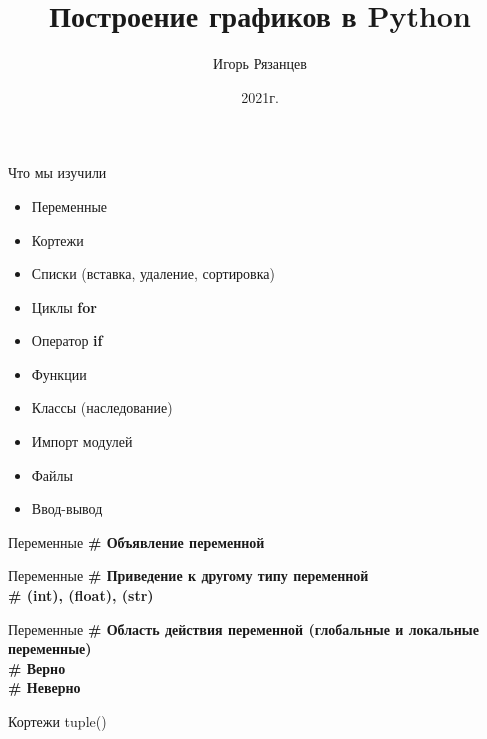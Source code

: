 \documentclass[12pt]{beamer}
\author{Игорь Рязанцев}
\title{Построение графиков в Python}
\institute{Лекция 04}
\date{2021г.}
\begin{document}
\begin{frame}
\titlepage
\end{frame}

\begin{frame}{Что мы изучили}
\begin{itemize}
\item Переменные 
\item Кортежи
\item Списки (вставка, удаление, сортировка)
\item Циклы \textbf{for}
\item Оператор \textbf{if}
\item Функции
\item Классы (наследование)
\item Импорт модулей
\item Файлы
\item Ввод-вывод 
\end{itemize}
\end{frame}


\begin{frame}{Переменные}
\textbf{\# Объявление переменной} \\
\vspace{0.5cm}

\end{frame}

\begin{frame}{Переменные}
\textbf{\# Приведение к другому типу переменной} \\
\textbf{\# (int), (float), (str) } \\
\vspace{0.0cm}

\end{frame}

\begin{frame}{Переменные}
\textbf{\# Область действия переменной (глобальные и локальные переменные)} \\
\vspace{0.4cm}
\textbf{\# Верно} \\

\vspace{0.4cm}
\textbf{\# Неверно} \\

\end{frame}


\begin{frame}{Кортежи tuple()}

\end{frame}
\end{document}
